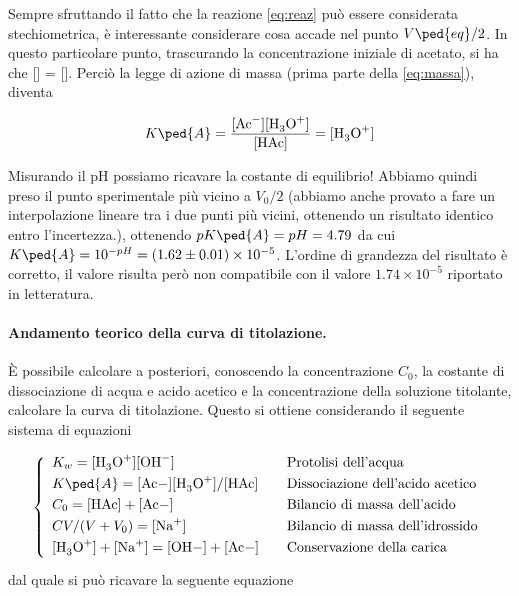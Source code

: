 Sempre sfruttando il fatto che la reazione \eqref{eq:reaz} può essere considerata stechiometrica,
è interessante considerare cosa accade nel punto $V\ped{eq}/2$. In questo particolare punto,
trascurando la concentrazione iniziale di acetato, si ha che [] = [].
Perciò la legge di azione di massa (prima parte della \eqref{eq:massa}), diventa 

\begin{equation}
    K\ped{A} = \frac{[\ce{Ac-}][\ce{H3O+}]}{[\ce{HAc}]} = [\ce{H3O+}]
\end{equation}

Misurando il pH possiamo ricavare la costante di equilibrio! Abbiamo quindi preso il punto sperimentale
più vicino a $V_0/2$ (abbiamo anche provato a fare un interpolazione lineare tra i due punti più
vicini, ottenendo un risultato identico entro l'incertezza.), ottenendo $pK\ped{A} = pH = 4.79$ da cui
$K\ped{A} = 10^{-pH} = (1.62 \pm 0.01) \times 10^{-5}$. L'ordine di grandezza del risultato è corretto, il valore
risulta però non compatibile con il valore $1.74 \times 10^{-5}$ riportato in letteratura.

\paragraph{Andamento teorico della curva di titolazione.}

È possibile calcolare a posteriori, conoscendo la concentrazione $C_0$, la costante di dissociazione di
acqua e acido acetico e la concentrazione della soluzione titolante, calcolare la curva di titolazione.
Questo si ottiene considerando il seguente sistema di equazioni

\begin{equation}
    \left\{
    \begin{array}{l @\qquad l} \smallskip
        K_w = [\ce{H3O+}][\ce{OH-}] & \text{Protolisi dell'acqua} \\ \smallskip
        K\ped{A} = [\ce{Ac-]}[\ce{H3O+}]/[\ce{HAc}] & \text{Dissociazione dell'acido acetico} \\ \smallskip
        C_0 = \ce{[HAc] + [Ac-]} & \text{Bilancio di massa dell'acido} \\ \smallskip
        CV/(V + V_0) = [\ce{Na+}] & \text{Bilancio di massa dell'idrossido} \\ \smallskip
        \ce{[H3O+] + [Na+] = [OH-] + [Ac-]} & \text{Conservazione della carica} \\
    \end{array}
    \right.
    \label{eq:sistemone}
\end{equation}
%
dal quale si può ricavare la seguente equazione

